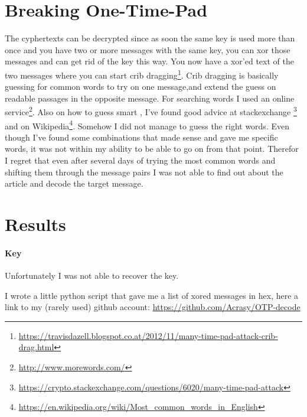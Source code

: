 \documentclass{scrartcl}
\newcommand\solution[2]{{\paragraph{#1}#2}}
\begin{document}
\section*{Breaking One-Time-Pad}
The cyphertexts can be decrypted since as soon the same key is used more than once and you have two or more messages with the same key, you can xor those messages and can get rid of the key this way. You now have a xor'ed text of the two messages where you can start crib dragging\footnote{\url{https://travisdazell.blogspot.co.at/2012/11/many-time-pad-attack-crib-drag.html}}. Crib dragging is basically guessing for common words to try on one message,and extend the guess on readable passages in the opposite message. For searching  words I used an online service\footnote{\url{http://www.morewords.com/}}. Also on how to guess smart , I've found good advice at stackexchange \footnote{\url{https://crypto.stackexchange.com/questions/6020/many-time-pad-attack}} and on Wikipedia\footnote{\url{https://en.wikipedia.org/wiki/Most_common_words_in_English}}.
Somehow I did not manage to guess the right words. Even though I've found some combinations that made sense and gave me specific words, it was not within my ability to be able to go on from that point. Therefor I regret that even after several days of trying the most common words and shifting them through the message pairs I was not able to find out about the article and decode the target message.

\section*{Results}

\solution{Key}{Unfortunately I was not able to recover the key.}



 I wrote a little python script that gave me a list of xored messages in hex, here a link to my (rarely used) github account: \url{https://github.com/Acrasy/OTP-decode}
\end{document}
